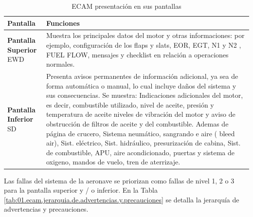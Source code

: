 \begin{table}[!h]
  \centering
\caption{ECAM presentaci\'on en sus pantallas}
\label{tab:01.ecam.presentacion.en.sus.pantallas}

  \begin{tabular}{m{0.3\textwidth}m{0.65\textwidth}} \hline {}
{\bf Pantalla} & {\bf Funciones } \\ \hline
  \parbox{\linewidth}{\textbf{Pantalla Superior} \\
  \ac{EWD}} 
& Muestra los principales datos del motor y otras informaciones: por ejemplo, configuración de los flaps y slats, EOR, \ac{EGT}, N1 y N2 , FUEL FLOW, mensajes y checklist en relación a operaciones normales. \\ 
  \parbox{\linewidth}{\textbf{Pantalla Inferior} \\
  \ac{SD}}
   & Presenta avisos permanentes de información adicional,  ya sea de forma automática o manual, lo cual incluye daños del sistema y sus consecuencias.  Se muestra: Indicaciones adicionales del motor, es decir, combustible utilizado, nivel de aceite, presión y temperatura de aceite niveles de vibración del motor y aviso de obstrucción de filtros de aceite y del combustible. Ademas de página de crucero, Sistema neumático, sangrando e aire ( bleed air), Sist. eléctrico, Sist. hidráulico, presurización de cabina, Sist. de combustible, APU, aire acondicionado, puertas y sistema de oxigeno, mandos de vuelo, tren de aterrizaje. \\ \hline
\end{tabular}

\end{table}


Las fallas del sistema de la aeronave se priorizan como fallas de nivel 1, 2 o 3 para la pantalla superior y / o inferior. En la Tabla \ref{tab:01.ecam.jerarquia.de.advertencias.y.precauciones} se detalla la jerarquía de advertencias y precauciones.

